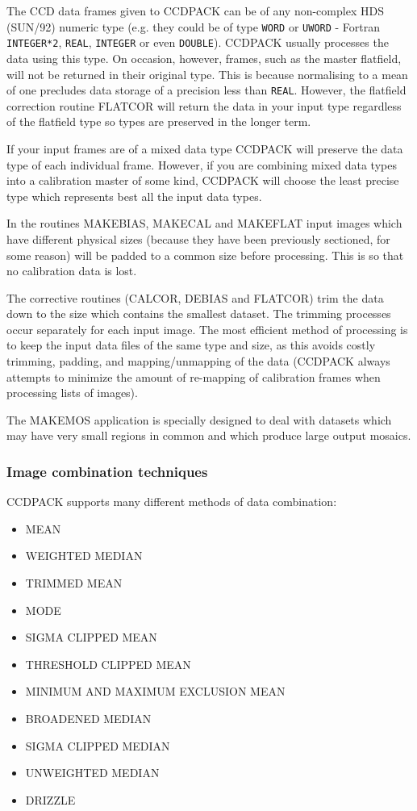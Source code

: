 \documentclass[twoside,11pt]{article}
\newcommand{\htmlref}[2]{#1}
\renewcommand{\_}{\texttt{\symbol{95}}}
\newcommand{\text}[1]{{\small \tt #1}}
\newcommand{\xroutine}[1]{\htmlref{{\sc #1}}{#1}}
\begin{document}
The CCD data frames given to CCDPACK can be of any non-complex HDS
(SUN/92) numeric type (e.g. they could be of type \text{\_WORD} or
\text{\_UWORD} - Fortran \text{INTEGER*2}, \text{\_REAL},
\text{\_INTEGER} or even  \text{\_DOUBLE}). CCDPACK usually processes
the data using this type. On occasion, however, frames, such as the
master flatfield, will not be returned in their original type. This is
because normalising to a mean of one precludes data storage of a
precision less than \text{\_REAL}. However, the flatfield correction routine
\xroutine{FLATCOR} will return the data in your input type regardless of the
flatfield type so types are preserved in the longer term.

If your input frames are of a mixed data type CCDPACK will preserve the data
type of each individual frame. However, if you are combining mixed data types
into a calibration master of some kind, CCDPACK will choose the least precise
type which represents best all the input data types.

In the routines \xroutine{MAKEBIAS}, \xroutine{MAKECAL} and
\xroutine{MAKEFLAT} input images which have
different physical sizes (because they have been previously sectioned,
for some reason) will be padded to a common size before processing. This
is so that no calibration data is lost.

The corrective routines (\xroutine{CALCOR}, \xroutine{DEBIAS} and \xroutine{FLATCOR}) trim the data down
to the size which contains the smallest dataset. The trimming processes
occur separately for each input image. The most efficient method of
processing is to keep the input data files of the same type and size, as
this avoids costly trimming, padding, and mapping/unmapping of the data
(CCDPACK always attempts to minimize the amount of re-mapping of
calibration frames when processing lists of images).

The \xroutine{MAKEMOS} application is specially designed to deal with datasets
which may have very small regions in common and which produce large
output mosaics.

\subsubsection{Image combination techniques \label{combinations}}

CCDPACK supports many different methods of data combination:
\begin{itemize}
\item MEAN
\item WEIGHTED MEDIAN
\item TRIMMED MEAN
\item MODE
\item SIGMA CLIPPED MEAN
\item THRESHOLD CLIPPED MEAN
\item MINIMUM AND MAXIMUM EXCLUSION MEAN
\item BROADENED MEDIAN
\item SIGMA CLIPPED MEDIAN
\item UNWEIGHTED MEDIAN
\item DRIZZLE
\end{itemize}
\end{document}
